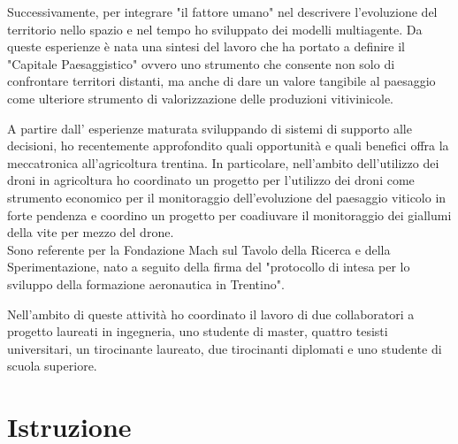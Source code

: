 \documentclass{curriculum}
\begin{document}
\begin{description}[style= unboxed, leftmargin= 0.5cm]
     Successivamente, per integrare "il fattore umano" nel descrivere l'evoluzione del territorio nello spazio e nel tempo ho sviluppato dei modelli multiagente. Da queste esperienze è nata una sintesi del lavoro che ha portato a definire il "Capitale Paesaggistico" ovvero uno strumento che consente non solo di confrontare territori distanti, ma anche di dare un valore tangibile al paesaggio come ulteriore strumento di valorizzazione delle produzioni vitivinicole. 
     \item[Droni e agricoltura di precisone] A partire dall' esperienze maturata sviluppando di sistemi di supporto alle decisioni, ho recentemente approfondito quali opportunità e quali benefici offra la meccatronica all'agricoltura trentina. In particolare, nell'ambito dell'utilizzo dei droni in agricoltura ho coordinato un progetto per l'utilizzo dei droni come strumento economico per il monitoraggio dell'evoluzione del paesaggio viticolo in forte pendenza e  coordino un progetto per coadiuvare il monitoraggio dei giallumi della vite per mezzo del drone.\\
     Sono referente per la Fondazione Mach sul Tavolo della Ricerca e della Sperimentazione, nato a seguito della firma del "protocollo di intesa per lo sviluppo della formazione aeronautica in Trentino".
    \end{description}
    
    Nell'ambito di queste attività ho coordinato il lavoro di due collaboratori a progetto laureati in ingegneria, uno studente di master, quattro tesisti universitari, un tirocinante laureato, due tirocinanti diplomati e uno studente di scuola superiore.
    
    \section{Istruzione}
\end{document}
